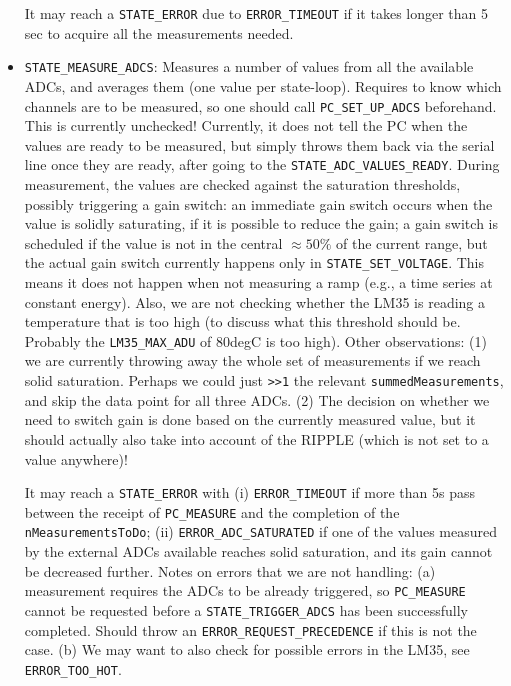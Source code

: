 \documentclass[11pt,a4paper,english]{article}
\begin{document}
\begin{itemize}
	It may reach a \texttt{STATE\_ERROR} due to \texttt{ERROR\_TIMEOUT} if it takes longer than 5 sec to acquire all the measurements needed.

\item \texttt{STATE\_MEASURE\_ADCS}: Measures a number of values from all the available ADCs, and averages them (one value per state-loop). Requires to know which channels are to be measured, so one should call \texttt{PC\_SET\_UP\_ADCS} beforehand. This is currently unchecked! Currently, it does not tell the PC when the values are ready to be measured, but simply throws them back via the serial line once they are ready, after going to the \texttt{STATE\_ADC\_VALUES\_READY}. During measurement, the values are checked against the saturation thresholds, possibly triggering a gain switch: an immediate gain switch occurs when the value is solidly saturating, if it is possible to reduce the gain; a gain switch is scheduled if the value is not in the central $\approx50\%$ of the current range, but the actual gain switch currently happens only in \texttt{STATE\_SET\_VOLTAGE}. This means it does not happen when not measuring a ramp (e.g., a time series at constant energy). Also, we are not checking whether the LM35 is reading a temperature that is too high (to discuss what this threshold should be. Probably the \texttt{LM35\_MAX\_ADU} of 80degC is too high). Other observations: (1) we are currently throwing away the whole set of measurements if we reach solid saturation. Perhaps we could just \texttt{>>1} the relevant \texttt{summedMeasurements}, and skip the data point for all three ADCs. (2) The decision on whether we need to switch gain is done based on the currently measured value, but it should actually also take into account of the RIPPLE (which is not set to a value anywhere)!

	It may reach a \texttt{STATE\_ERROR} with (i) \texttt{ERROR\_TIMEOUT} if more than 5s pass between the receipt of  \texttt{PC\_MEASURE} and the completion of the \texttt{nMeasurementsToDo}; (ii) \texttt{ERROR\_ADC\_SATURATED} if one of the values measured by the external ADCs available reaches solid saturation, and its gain cannot be decreased further. Notes on errors that we are not handling: (a) measurement requires the ADCs to be already triggered, so \texttt{PC\_MEASURE} cannot be requested before a \texttt{STATE\_TRIGGER\_ADCS} has been successfully completed. Should throw an \texttt{ERROR\_REQUEST\_PRECEDENCE} if this is not the case. (b) We may want to also check for possible errors in the LM35, see \texttt{ERROR\_TOO\_HOT}.


\end{itemize}
\end{document}
